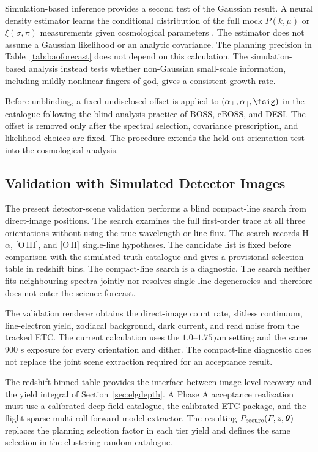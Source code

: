 Simulation-based inference provides a second test of the Gaussian result. A neural density estimator learns the conditional distribution of the full mock $P(k,\mu)$ or $\xi(\sigma,\pi)$ measurements given cosmological parameters \cite{cranmer2020}. The estimator does not assume a Gaussian likelihood or an analytic covariance. The planning precision in Table~\ref{tab:baoforecast} does not depend on this calculation. The simulation-based analysis instead tests whether non-Gaussian small-scale information, including mildly nonlinear fingers of god, gives a consistent growth rate.

Before unblinding, a fixed undisclosed offset is applied to $(\alpha_\perp,\alpha_\parallel,\fsig)$ in the catalogue following the blind-analysis practice of BOSS, eBOSS, and DESI. The offset is removed only after the spectral selection, covariance prescription, and likelihood choices are fixed. The procedure extends the held-out-orientation test into the cosmological analysis.

\subsection{Validation with Simulated Detector Images}\label{sec:e2eval}

The present detector-scene validation performs a blind compact-line search from direct-image positions. The search examines the full first-order trace at all three orientations without using the true wavelength or line flux. The search records H$\alpha$, [O\,III], and [O\,II] single-line hypotheses. The candidate list is fixed before comparison with the simulated truth catalogue and gives a provisional selection table in redshift bins. The compact-line search is a diagnostic. The search neither fits neighbouring spectra jointly nor resolves single-line degeneracies and therefore does not enter the science forecast.

The validation renderer obtains the direct-image count rate, slitless continuum, line-electron yield, zodiacal background, dark current, and read noise from the tracked ETC. The current calculation uses the $1.0$--$1.75\,\mu$m setting and the same $900$ s exposure for every orientation and dither. The compact-line diagnostic does not replace the joint scene extraction required for an acceptance result.

The redshift-binned table provides the interface between image-level recovery and the yield integral of Section~\ref{sec:elgdepth}. A Phase A acceptance realization must use a calibrated deep-field catalogue, the calibrated ETC package, and the flight sparse multi-roll forward-model extractor. The resulting $P_{\rm secure}(F,z,\boldsymbol{\theta})$ replaces the planning selection factor in each tier yield and defines the same selection in the clustering random catalogue.

